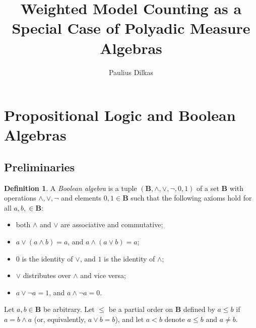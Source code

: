 \documentclass{article}
\title{Weighted Model Counting as a Special Case of Polyadic Measure Algebras}
\author{Paulius Dilkas}
\theoremstyle{definition}
\newtheorem{definition}{Definition}
\theoremstyle{remark}
\begin{document}
\maketitle




\section{Propositional Logic and Boolean Algebras}

\subsection{Preliminaries}

\begin{definition} \label{def:ba}
  A \emph{Boolean algebra} is a tuple $(\mathbf{B}, \land, \lor, \neg, 0, 1)$ of
  a set $\mathbf{B}$ with operations $\land, \lor, \neg$ and elements $0, 1 \in
  \mathbf{B}$ such that the following axioms hold for all $a, b, \in
  \mathbf{B}$:
  \begin{itemize}
  \item both $\land$ and $\lor$ are associative and commutative;
  \item $a \lor (a \land b) = a$, and $a \land (a \lor b) = a$;
  \item $0$ is the identity of $\lor$, and $1$ is the identity of $\land$;
  \item $\lor$ distributes over $\land$ and vice versa;
  \item $a \lor \neg a = 1$, and $a \land \neg a = 0$.
  \end{itemize}

  Let $a, b \in \mathbf{B}$ be arbitrary. Let $\le$ be a partial order on
  $\mathbf{B}$ defined by $a \le b$ if $a = b \land a$ (or, equivalently, $a
  \lor b = b$), and let $a < b$ denote $a \le b$ and $a \ne b$.
\end{definition}
\end{document}
